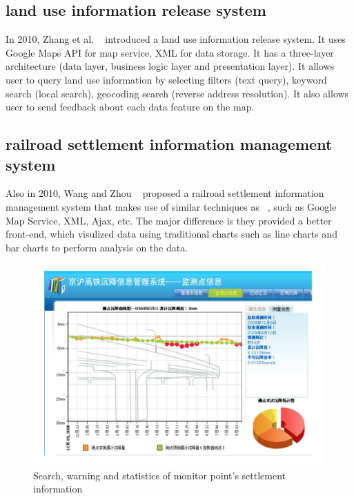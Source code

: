 \documentclass{egpubl}
\begin{document}
\subsection{land use information release system}
In 2010, Zhang et al. ~\cite{zhang2010land} introduced a land use information release system. It uses Google Maps API for map service, XML for data storage. It has a three-layer architecture (data layer, business logic layer and presentation layer). It allows user to query land use information by selecting filters (text query), keyword search (local search), geocoding search (reverse address resolution). It also allows user to send feedback about each data feature on the map.

\subsection{railroad settlement information management system}
Also in 2010, Wang and Zhou ~\cite{wang2010settlement} proposed a railroad settlement information management system that makes use of similar techniques as ~\cite{zhang2010land}, such as Google Map Service, XML, Ajax, etc. The major difference is they provided a better front-end, which visulized data using traditional charts such as line charts and bar charts to perform analysis on the data.

\begin{figure}[htb]
  \centering
  \includegraphics[width=.95\linewidth]{star-3-1}
  \caption{\label{fig:star-3-1} Search, warning and statistics of monitor point’s settlement information}
\end{figure}
\end{document}
